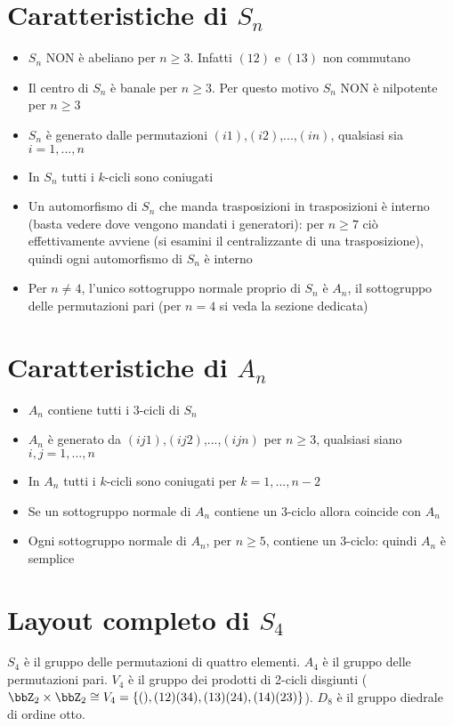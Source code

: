 \documentclass[a4paper,NoNotes,GeneralMath]{stdmdoc}
\begin{document}
	\section*{Caratteristiche di $S_n$}
	\begin{itemize}
		\item $S_n$ NON è abeliano per $n \ge 3$. Infatti $(1 2)$ e $(1 3)$ non commutano
		\item Il centro di $S_n$ è banale per $n \ge 3$. Per questo motivo $S_n$ NON è nilpotente per $n \ge 3$
		\item $S_n$ è generato dalle permutazioni $(i 1)$,$(i 2)$,...,$(i n)$, qualsiasi sia $i = {1,...,n}$
		\item In $S_n$ tutti i $k$-cicli sono coniugati
		\item Un automorfismo di $S_n$ che manda trasposizioni in trasposizioni è interno (basta vedere dove vengono mandati i generatori): per $n \ge 7$ ciò effettivamente avviene (si esamini il 			centralizzante di una trasposizione), quindi ogni automorfismo di $S_n$ è interno
		\item Per $n \ne 4$, l'unico sottogruppo normale proprio di $S_n$ è $A_n$, il sottogruppo delle permutazioni pari (per $n=4$ si veda la sezione dedicata)
	\end{itemize}

	\section*{Caratteristiche di $A_n$}
	\begin{itemize}
		\item $A_n$ contiene tutti i $3$-cicli di $S_n$
		\item $A_n$ è generato da $(i j 1)$,$(i j 2)$,...,$(i j n)$ per $n \ge 3$, qualsiasi siano $i,j = {1,...,n}$
		\item In $A_n$ tutti i $k$-cicli sono coniugati per $k = {1,...,n-2}$
		\item Se un sottogruppo normale di $A_n$ contiene un $3$-ciclo allora coincide con $A_n$
		\item Ogni sottogruppo normale di $A_n$, per $n \ge 5$, contiene un $3$-ciclo: quindi $A_n$ è semplice
	\end{itemize}

	\section*{Layout completo di $S_4$}
	$S_4$ è il gruppo delle permutazioni di quattro elementi. $A_4$ è il gruppo delle permutazioni pari. $V_4$ è il gruppo dei prodotti di 2-cicli disgiunti ($\bbZ_{2}\times \bbZ_{2} \cong V_4 = \{(), (12)(34), (13)(24), (14)(23)\}$). $D_8$ è il gruppo diedrale di ordine otto.
\end{document}
